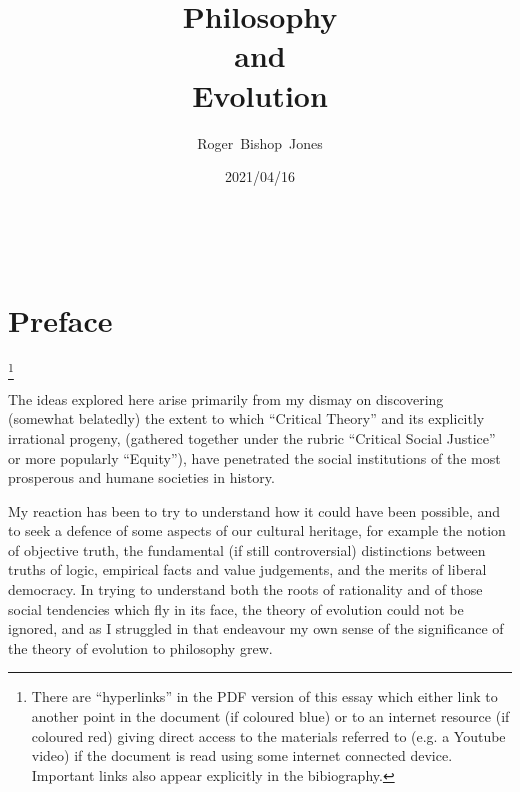 \documentclass[10pt,titlepage]{article}
\title{\bf{\LARGE Philosophy\\and\\Evolution}}
\author{Roger~Bishop~Jones}
\date{\small 2021/04/16}
\newcommand{\ignore}[1]{}
\begin{document}
% 
                               
\begin{titlepage}
\maketitle





\end{titlepage}

\ \

\ignore{
\begin{centering}
{}
\end{centering}
}%

\setcounter{tocdepth}{2}
{\parskip-0pt\tableofcontents}


\pagebreak

\section*{Preface}



\footnote{There are ``hyperlinks'' in the PDF version of this essay which either link to another point in the document  (if coloured blue) or to an internet resource  (if coloured red) giving direct access to the materials referred to (e.g. a Youtube video) if the document is read using some internet connected device.
Important links also appear explicitly in the bibiography.}

The ideas explored here arise primarily from my dismay on discovering (somewhat belatedly) the extent to which ``Critical Theory'' and its explicitly irrational progeny, (gathered together under the rubric ``Critical Social Justice'' or more popularly ``Equity''), have penetrated the social institutions of the most prosperous and humane societies in history.

My reaction has been to try to understand how it could have been possible, and to seek a defence of some aspects of our cultural heritage, for example the notion of objective truth, the fundamental (if still controversial) distinctions between truths of logic, empirical facts and value judgements, and the merits of liberal democracy.
In trying to understand both the roots of rationality and of those social tendencies which fly in its face, the theory of evolution could not be ignored, and as I struggled in that endeavour my own sense of the significance of the theory of evolution to philosophy grew.
\end{document}
